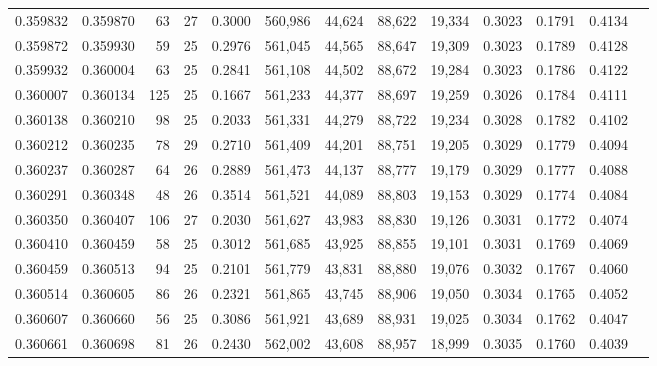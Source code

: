 \begin{tabular}{rrrrrrrrrrrrr}
0.359832 & 0.359870 &    63 &  27 &                                     0.3000 & 560,986 &  44,624 &  88,622 &  19,334 & 0.3023 & 0.1791 & 0.4134 \\
0.359872 & 0.359930 &    59 &  25 &                                     0.2976 & 561,045 &  44,565 &  88,647 &  19,309 & 0.3023 & 0.1789 & 0.4128 \\
0.359932 & 0.360004 &    63 &  25 &                                     0.2841 & 561,108 &  44,502 &  88,672 &  19,284 & 0.3023 & 0.1786 & 0.4122 \\
0.360007 & 0.360134 &   125 &  25 &                                     0.1667 & 561,233 &  44,377 &  88,697 &  19,259 & 0.3026 & 0.1784 & 0.4111 \\
0.360138 & 0.360210 &    98 &  25 &                                     0.2033 & 561,331 &  44,279 &  88,722 &  19,234 & 0.3028 & 0.1782 & 0.4102 \\
0.360212 & 0.360235 &    78 &  29 &                                     0.2710 & 561,409 &  44,201 &  88,751 &  19,205 & 0.3029 & 0.1779 & 0.4094 \\
0.360237 & 0.360287 &    64 &  26 &                                     0.2889 & 561,473 &  44,137 &  88,777 &  19,179 & 0.3029 & 0.1777 & 0.4088 \\
0.360291 & 0.360348 &    48 &  26 &                                     0.3514 & 561,521 &  44,089 &  88,803 &  19,153 & 0.3029 & 0.1774 & 0.4084 \\
0.360350 & 0.360407 &   106 &  27 &                                     0.2030 & 561,627 &  43,983 &  88,830 &  19,126 & 0.3031 & 0.1772 & 0.4074 \\
0.360410 & 0.360459 &    58 &  25 &                                     0.3012 & 561,685 &  43,925 &  88,855 &  19,101 & 0.3031 & 0.1769 & 0.4069 \\
0.360459 & 0.360513 &    94 &  25 &                                     0.2101 & 561,779 &  43,831 &  88,880 &  19,076 & 0.3032 & 0.1767 & 0.4060 \\
0.360514 & 0.360605 &    86 &  26 &                                     0.2321 & 561,865 &  43,745 &  88,906 &  19,050 & 0.3034 & 0.1765 & 0.4052 \\
0.360607 & 0.360660 &    56 &  25 &                                     0.3086 & 561,921 &  43,689 &  88,931 &  19,025 & 0.3034 & 0.1762 & 0.4047 \\
0.360661 & 0.360698 &    81 &  26 &                                     0.2430 & 562,002 &  43,608 &  88,957 &  18,999 & 0.3035 & 0.1760 & 0.4039 \\

\end{tabular}
